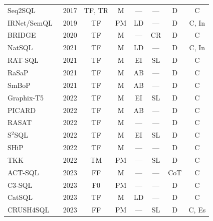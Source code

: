 {\begin{longtable}{@{}llcccccc@{}}
Seq2SQL~\cite{Seq2SQL2017}              & 2017 & TF, TR     & M       & ---     & ---       & D       & C       \\
IRNet/SemQL~\cite{guo2019irnet}         & 2019 & TF         & PM      & LD      & ---       & D       & C, In   \\
BRIDGE~\cite{BRIDGE2020}                & 2020 & TF         & M       & ---     & CR        & D       & C       \\
NatSQL~\cite{gan2021natsql}             & 2021 & TF         & M       & LD      & ---       & D       & C, In   \\
RAT-SQL~\cite{RAT-SQL2021}              & 2021 & TF         & M       & EI      & SL        & D       & C       \\
RaSaP~\cite{RaSaP2021}                  & 2021 & TF         & M       & AB      & ---       & D       & C       \\
SmBoP~\cite{SmBoP2021}                  & 2021 & TF         & M       & AB      & ---       & D       & C       \\
Graphix-T5~\cite{Graphix-T52022}        & 2022 & TF         & M       & EI      & SL        & D       & C       \\
PICARD~\cite{PICARD2022}                & 2022 & TF         & M       & AB      & ---       & D       & C       \\
RASAT~\cite{RASAT2022}                  & 2022 & TF         & M       & ---     & ---       & D       & C       \\
S$^{2}$SQL~\cite{S2SQL2022}             & 2022 & TF         & M       & EI      & SL        & D       & C       \\
SHiP~\cite{SHiP2022}                    & 2022 & TF         & M       & ---     & ---       & D       & C       \\
TKK~\cite{TKK2022}                      & 2022 & TM         & PM      & ---     & SL        & D       & C       \\
ACT-SQL~\cite{ACT-SQL2023}              & 2023 & FF         & M       & ---     & ---       & CoT     & C       \\
C3-SQL~\cite{C3-SQL2023}                & 2023 & F0         & PM      & ---     & ---       & D       & C       \\
CatSQL~\cite{CatSQL2023}                & 2023 & TF         & M       & LD      & ---       & D       & C       \\
CRUSH4SQL~\cite{CRUSH4SQL2023}          & 2023 & FF         & PM      & ---     & SL        & D       & C, Es   \\

\end{longtable}}
